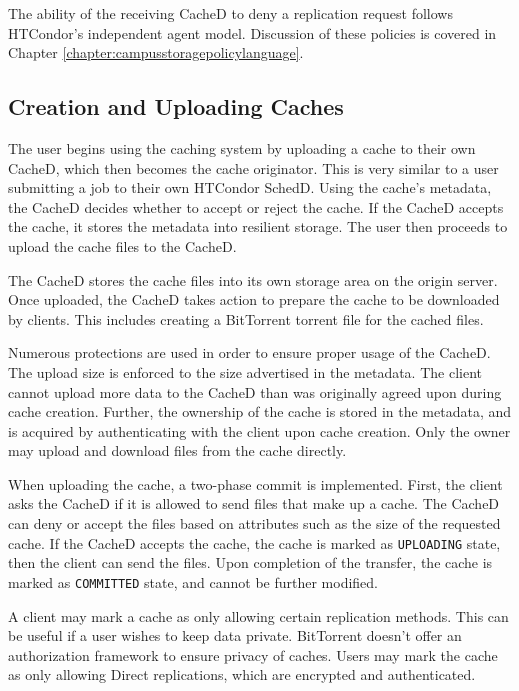 The ability of the receiving CacheD to deny a replication request follows HTCondor's independent agent model.  Discussion of these policies is covered in Chapter \ref{chapter:campusstoragepolicylanguage}.





\subsection{Creation and Uploading Caches}
The user begins using the caching system by uploading a cache to their own CacheD, which then becomes the cache originator.  This is very similar to a user submitting a job to their own HTCondor SchedD.  Using the cache's metadata, the CacheD decides whether to accept or reject the cache.  If the CacheD accepts the cache, it stores the metadata into resilient storage.  The user then proceeds to upload the cache files to the CacheD.

The CacheD stores the cache files into its own storage area on the origin server.  Once uploaded, the CacheD takes action to prepare the cache to be downloaded by clients.  This includes creating a BitTorrent torrent file for the cached files.  

Numerous protections are used in order to ensure proper usage of the CacheD.  The upload size is enforced to the size advertised in the metadata.  The client cannot upload more data to the CacheD than was originally agreed upon during cache creation.  Further, the ownership of the cache is stored in the metadata, and is acquired by authenticating with the client upon cache creation.  Only the owner may upload and download files from the cache directly.

When uploading the cache, a two-phase commit is implemented.  First, the client asks the CacheD if it is allowed to send files that make up a cache.  The CacheD can deny or accept the files based on attributes such as the size of the requested cache.  If the CacheD accepts the cache, the cache is marked as \texttt{UPLOADING} state, then the client can send the files.  Upon completion of the transfer, the cache is marked as \texttt{COMMITTED} state, and cannot be further modified.

A client may mark a cache as only allowing certain replication methods.  This can be useful if a user wishes to keep data private. BitTorrent doesn't offer an authorization framework to ensure privacy of caches. Users may mark the cache as only allowing Direct replications, which are encrypted and authenticated.

